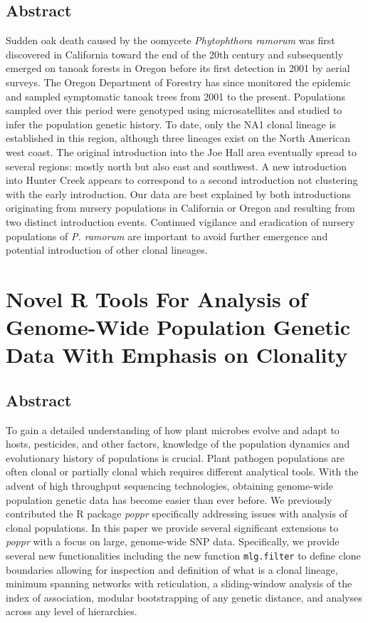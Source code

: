 \documentclass[double,12pt]{beavtex}
\begin{document}
  \section{Abstract}\label{abstract-1}
  
  Sudden oak death caused by the oomycete \emph{Phytophthora ramorum} was
  first discovered in California toward the end of the 20th century and
  subsequently emerged on tanoak forests in Oregon before its first
  detection in 2001 by aerial surveys. The Oregon Department of Forestry
  has since monitored the epidemic and sampled symptomatic tanoak trees
  from 2001 to the present. Populations sampled over this period were
  genotyped using microsatellites and studied to infer the population
  genetic history. To date, only the NA1 clonal lineage is established in
  this region, although three lineages exist on the North American west
  coast. The original introduction into the Joe Hall area eventually
  spread to several regions: mostly north but also east and southwest. A
  new introduction into Hunter Creek appears to correspond to a second
  introduction not clustering with the early introduction. Our data are
  best explained by both introductions originating from nursery
  populations in California or Oregon and resulting from two distinct
  introduction events. Continued vigilance and eradication of nursery
  populations of \emph{P. ramorum} are important to avoid further
  emergence and potential introduction of other clonal lineages.
  
  \chapter{Novel R Tools For Analysis of Genome-Wide Population Genetic
  Data With Emphasis on
  Clonality}\label{novel-r-tools-for-analysis-of-genome-wide-population-genetic-data-with-emphasis-on-clonality}
  
  \section{Abstract}\label{abstract-2}
  
  To gain a detailed understanding of how plant microbes evolve and adapt
  to hosts, pesticides, and other factors, knowledge of the population
  dynamics and evolutionary history of populations is crucial. Plant
  pathogen populations are often clonal or partially clonal which requires
  different analytical tools. With the advent of high throughput
  sequencing technologies, obtaining genome-wide population genetic data
  has become easier than ever before. We previously contributed the R
  package \emph{poppr} specifically addressing issues with analysis of
  clonal populations. In this paper we provide several significant
  extensions to \emph{poppr} with a focus on large, genome-wide SNP data.
  Specifically, we provide several new functionalities including the new
  function \texttt{mlg.filter} to define clone boundaries allowing for
  inspection and definition of what is a clonal lineage, minimum spanning
  networks with reticulation, a sliding-window analysis of the index of
  association, modular bootstrapping of any genetic distance, and analyses
  across any level of hierarchies.
  
\end{document}
